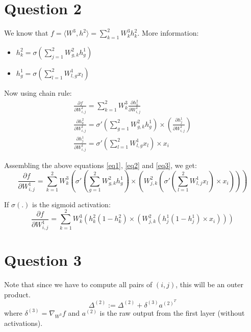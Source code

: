 \documentclass{article}
\newcommand{\dO}{\partial}
\begin{document}
\section*{Question 2}
\begin{flushleft}
We know that \(f = \langle W^{3}, h^{2} \rangle = \displaystyle \sum_{k=1}^{2} W^{3}_{k}h^{2}_{k}\).
More information:
\begin{itemize}
\item \(\displaystyle h^{2}_{k} = \sigma\left(\sum_{j=1}^{2} W^{2}_{g, k} h^{1}_{g}\right) \)
\item \(\displaystyle h^{1}_{g} = \sigma\left(\sum_{l=1}^{2} W^{1}_{l, g} x_{l}\right) \)
\end{itemize}
Now using chain rule:
\begin{gather}
\label{eq1}
\displaystyle \frac{\dO f}{\dO W^{1}_{i, j}} = \sum_{k=1}^{2}W^{3}_{k}\frac{\dO h^{2}_{k}}{\dO W^{1}_{i, j}} \\
\label{eq2}
\displaystyle \frac{\dO h^{2}_{k}}{\dO W^{1}_{i, j}} = \sigma'\left(\sum_{g=1}^{2} W^{2}_{g,k}h^{1}_{g}\right) \times \left(\frac{\dO h^{1}_{j}}{\dO W^{1}_{i, j}}\right) \\
\label{eq3}
\displaystyle \frac{\dO h^{1}_{j}}{\dO W^{1}_{i, j}} = \sigma'\left(\sum_{l=1}^{2} W^{1}_{l,g}x_{l}\right) \times x_{i}
\end{gather}

Assembling the above equations \ref{eq1}, \ref{eq2} and \ref{eq3}, we get:
\begin{equation}
\displaystyle \frac{\dO f}{\dO W^{1}_{i,j}} = \sum_{k=1}^{2}W^{3}_{k}\left(\sigma'\left(\sum_{g=1}^{2} W^{2}_{g,k}h^{1}_{g}\right) \times \left(W^{2}_{j, k} \left(\sigma'\left(\sum_{l=1}^{2} W^{1}_{l,j}x_{l}\right) \times x_{i}\right) \right) \right)
\end{equation}

If \(\sigma(.)\) is the sigmoid activation:
\begin{equation}
\displaystyle \frac{\dO f}{\dO W^{1}_{i, j}} = \sum_{k=1}^{2}W^{3}_{k} \left(h^{2}_{k} (1 - h^{2}_{k}) \times \left(W^{2}_{j,k} \left(h^{1}_{j} (1 - h^{1}_{j}) \times x_{i}\right) \right)\right)
\end{equation}
\end{flushleft}

\section*{Question 3}
\begin{flushleft}
Note that since we have to compute all pairs of \((i, j)\), this will be an outer product.
\begin{equation}
\Delta^{(2)} := \Delta^{(2)} + \delta^{(3)} a^{(2)^{T}}
\end{equation}
where \(\delta^{(3)} = \nabla_{W^{3}} f\) and \(a^{(2)}\) is the raw output from the first layer (without activations).
\end{flushleft}
\end{document}

